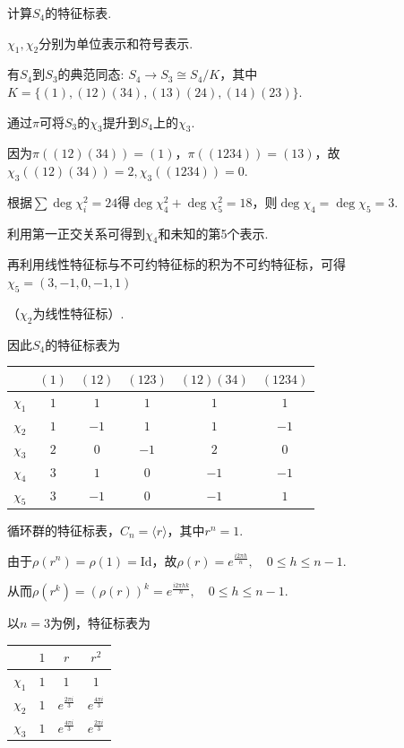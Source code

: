 
\begin{instance}
    计算$S_4$的特征标表.\par
    $\chi_1, \chi_2$分别为单位表示和符号表示.\par
    有$S_4$到$S_3$的典范同态: $S_4 \to S_3 \cong S_4/K$，其中$K = \{(1), (12)(34), (13)(24), (14)(23)\}$.\par
    通过$\pi$可将$S_3$的$\chi_3$提升到$S_4$上的$\chi_3$.\par
    因为$\pi((12)(34))=(1)$，$\pi((1234))=(13)$，故$\chi_3((12)(34))=2, \chi_3((1234))=0$.\par
    根据$\sum \deg \chi_i^2 = 24$得$\deg \chi_4^2 + \deg \chi_5^2 = 18$，则$\deg \chi_4 = \deg \chi_5 = 3$.\par
    利用第一正交关系可得到$\chi_4$和未知的第5个表示.\par
    再利用线性特征标与不可约特征标的积为不可约特征标，可得$\chi_5 = (3, -1, 0, -1, 1)$\par
    （$\chi_2$为线性特征标）.\par
    因此$S_4$的特征标表为
    \begin{center}
        \begin{tabular}{c|ccccc}
                     & $(1)$ & $(12)$ & $(123)$ & $(12)(34)$ & $(1234)$ \\ \hline
            $\chi_1$ & $1$   & $1$    & $1$     & $1$        & $1$      \\
            $\chi_2$ & $1$   & $-1$   & $1$     & $1$        & $-1$     \\
            $\chi_3$ & $2$   & $0$    & $-1$    & $2$        & $0$      \\
            $\chi_4$ & $3$   & $1$    & $0$     & $-1$       & $-1$     \\
            $\chi_5$ & $3$   & $-1$   & $0$     & $-1$       & $1$
        \end{tabular}
    \end{center}
\end{instance}

\begin{instance}
    循环群的特征标表，$C_n = \langle r \rangle$，其中$r^n = 1$.\par
    由于$\rho(r^n) = \rho(1) = \mathrm{Id}$，故$\rho(r) = e^{\frac{i2\pi h}{n}}, \quad 0 \leqslant h \leqslant n-1$.\par
    从而$\rho(r^k) = (\rho(r))^k = e^{\frac{i2\pi h k}{n}}, \quad 0 \leqslant h \leqslant n-1$.\par
    以$n=3$为例，特征标表为
    \begin{center}
        \begin{tabular}{c|ccc}
                     & $1$ & $r$ & $r^2$ \\ \hline
            $\chi_1$ & $1$ & $1$ & $1$ \\
            $\chi_2$ & $1$ & $e^{\frac{2\pi i}{3}}$ & $e^{\frac{4\pi i}{3}}$ \\
            $\chi_3$ & $1$ & $e^{\frac{4\pi i}{3}}$ & $e^{\frac{2\pi i}{3}}$
        \end{tabular}
    \end{center}
\end{instance}

